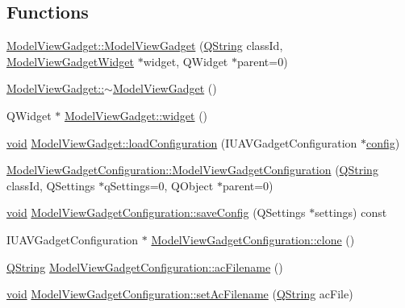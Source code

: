 \subsection*{Functions}
\begin{DoxyCompactItemize}
\item 
\hyperlink{group___model_view_plugin_ga411c180daebc524f226c60cef529bcd4}{Model\-View\-Gadget\-::\-Model\-View\-Gadget} (\hyperlink{group___u_a_v_objects_plugin_gab9d252f49c333c94a72f97ce3105a32d}{Q\-String} class\-Id, \hyperlink{class_model_view_gadget_widget}{Model\-View\-Gadget\-Widget} $\ast$widget, Q\-Widget $\ast$parent=0)
\item 
\hyperlink{group___model_view_plugin_ga0b914fe76448332e8f22649b75984f4d}{Model\-View\-Gadget\-::$\sim$\-Model\-View\-Gadget} ()
\item 
Q\-Widget $\ast$ \hyperlink{group___model_view_plugin_ga9240ecd7243b93f3188923a7a28926b1}{Model\-View\-Gadget\-::widget} ()
\item 
\hyperlink{group___u_a_v_objects_plugin_ga444cf2ff3f0ecbe028adce838d373f5c}{void} \hyperlink{group___model_view_plugin_gae2075c43d77a6afba12fa43cbda0af36}{Model\-View\-Gadget\-::load\-Configuration} (I\-U\-A\-V\-Gadget\-Configuration $\ast$\hyperlink{deflate_8c_a4473b5227787415097004fd39f55185e}{config})
\item 
\hyperlink{group___model_view_plugin_ga68c5b45bcb3a5b4f35186957e765e343}{Model\-View\-Gadget\-Configuration\-::\-Model\-View\-Gadget\-Configuration} (\hyperlink{group___u_a_v_objects_plugin_gab9d252f49c333c94a72f97ce3105a32d}{Q\-String} class\-Id, Q\-Settings $\ast$q\-Settings=0, Q\-Object $\ast$parent=0)
\item 
\hyperlink{group___u_a_v_objects_plugin_ga444cf2ff3f0ecbe028adce838d373f5c}{void} \hyperlink{group___model_view_plugin_gaa2ed9dd347aecb4518cf716e3fbd9288}{Model\-View\-Gadget\-Configuration\-::save\-Config} (Q\-Settings $\ast$settings) const 
\item 
I\-U\-A\-V\-Gadget\-Configuration $\ast$ \hyperlink{group___model_view_plugin_gafe85c40e0602f4bb0a8f54637fd87b2c}{Model\-View\-Gadget\-Configuration\-::clone} ()
\item 
\hyperlink{group___u_a_v_objects_plugin_gab9d252f49c333c94a72f97ce3105a32d}{Q\-String} \hyperlink{group___model_view_plugin_ga38f0d11e16e59ffff87290b2a222468e}{Model\-View\-Gadget\-Configuration\-::ac\-Filename} ()
\item 
\hyperlink{group___u_a_v_objects_plugin_ga444cf2ff3f0ecbe028adce838d373f5c}{void} \hyperlink{group___model_view_plugin_ga5a6c75e6ec1963b48ad4cd6fd1f80e67}{Model\-View\-Gadget\-Configuration\-::set\-Ac\-Filename} (\hyperlink{group___u_a_v_objects_plugin_gab9d252f49c333c94a72f97ce3105a32d}{Q\-String} ac\-File)

\end{DoxyCompactItemize}
